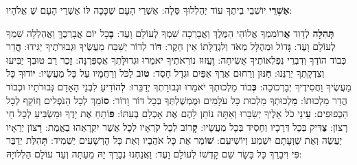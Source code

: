 

\textbf{אַשְׁרֵי} יוֹשְׁבֵי בֵיתֶךָ עוֹד יְהַלְלוּךָ סֶּלָה: אַשְׁרֵי הָעָם שֶׁכָּכָה לּוֹ אַשְׁרֵי הָעָם שֶׁ\Shem{} אֱלֹהָיו:

\textbf{תְּהִלָּה} לְדָוִד \textbf{אֲ}רוֹמִמְךָ אֱלוֹהַי הַמֶּלֶךְ וַאֲבָרְכָה שִׁמְךָ לְעוֹלָם וָעֶד: \textbf{בְּ}כָל יוֹם אֲבָרְכֶךָּ וַאֲהַלְלָה שִׁמְךָ לְעוֹלָם וָעֶד: \textbf{גָּ}דוֹל \Shem{} וּמְהֻלָּל מְאֹד וְלִגְדֻלָּתוֹ אֵין חֵקֶר: \textbf{דּ}וֹר לְדוֹר יְשַׁבַּח מַעֲשֶׂיךָ וּגְבוּרֹתֶיךָ יַגִּידוּ: \textbf{הֲ}דַר כְּבוֹד הוֹדֶךָ וְדִבְרֵי נִפְלְאוֹתֶיךָ אָשִׂיחָה: \textbf{וֶ}עֱזוּז נוֹרְאֹתֶיךָ יֹאמֵרוּ וּגְדוּלָּתְךָ אֲסַפְּרֶנָּה: \textbf{זֵ}כֶר רַב טוּבְךָ יַבִּיעוּ וְצִדְקָתְךָ יְרַנֵּנוּ: \textbf{חַ}נּוּן וְרַחוּם \Shem{} אֶרֶךְ אַפַּיִם וּגְדָל חָסֶד: \textbf{ט}וֹב \Shem{} לַכֹּל וְרַחֲמָיו עַל כָּל מַעֲשָׂיו: \textbf{י}וֹדוּךָ \Shem{} כָּל מַעֲשֶׂיךָ וַחֲסִידֶיךָ יְבָרְכוּכָה: \textbf{כְּ}בוֹד מַלְכוּתְךָ יֹאמֵרוּ וּגְבוּרָתְךָ יְדַבֵּרוּ: \textbf{לְ}הוֹדִיעַ לִבְנֵי הָאָדָם גְּבוּרֹתָיו וּכְבוֹד הֲדַר מַלְכוּתוֹ: \textbf{מַ}לְכוּתְךָ מַלְכוּת כָּל עֹלָמִים וּמֶמְשֶׁלְתְּךָ בְּכָל דּוֹר וָדוֹר: \textbf{ס}וֹמֵךְ \Shem{} לְכָל הַנֹּפְלִים וְזוֹקֵף לְכָל הַכְּפוּפִים: \textbf{עֵ}ינֵי כֹל אֵלֶיךָ יְשַׂבֵּרוּ וְאַתָּה נוֹתֵן לָהֶם אֶת אָכְלָם בְּעִתּוֹ: \textbf{פּ}וֹתֵחַ אֶת יָדֶךָ וּמַשְׂבִּיעַ לְכָל חַי רָצוֹן: \textbf{צַ}דִּיק \Shem{} בְּכָל דְּרָכָיו וְחָסִיד בְּכָל מַעֲשָׂיו: \textbf{קָ}רוֹב \Shem{} לְכָל קֹרְאָיו לְכָל אֲשֶׁר יִקְרָאֻהוּ בֶאֱמֶת: \textbf{רְ}צוֹן יְרֵאָיו יַעֲשֶׂה וְאֶת שַׁוְעָתָם יִשְׁמַע וְיוֹשִׁיעֵם: \textbf{שׁ}וֹמֵר \Shem{} אֶת כָּל אֹהֲבָיו וְאֵת כָּל הָרְשָׁעִים יַשְׁמִיד: \textbf{תְּ}הִלַּת \Shem{} יְדַבֶּר פִּי וִיבָרֵךְ כָּל בָּשָׂר שֵׁם קָדְשׁוֹ לְעוֹלָם וָעֶד: וַאֲנַחְנוּ נְבָרֵךְ יָהּ מֵעַתָּה וְעַד עוֹלָם הַלְלוּיָהּ:

\divider


